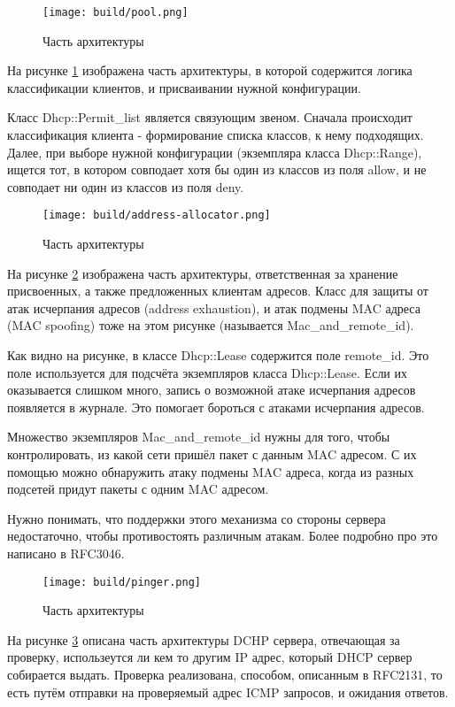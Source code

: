 \documentclass[14pt,a4paper]{extarticle}
\begin{document}
\begin{figure}[H]
    \texttt{[image: build/pool.png]}
    \caption{Часть архитектуры}
    \label{fig:pool}
\end{figure}

На рисунке \ref{fig:pool} изображена часть архитектуры, в которой содержится логика классификации клиентов, и присваивании нужной конфигурации.

Класс Dhcp::Permit\_list является связующим звеном.
Сначала происходит классификация клиента - формирование списка классов, к нему подходящих.
Далее, при выборе нужной конфигурации (экземпляра класса Dhcp::Range), ищется тот, в котором совподает хотя бы один из классов из поля allow, и не совподает ни один из классов из поля deny.

\begin{figure}[H]
    \texttt{[image: build/address-allocator.png]}
    \caption{Часть архитектуры}
    \label{fig:address_allocator}
\end{figure}

На рисунке \ref{fig:address_allocator} изображена часть архитектуры, ответственная за хранение присвоенных, а также предложенных клиентам адресов.
Класс для защиты от атак исчерпания адресов (address exhaustion), и атак подмены MAC адреса (MAC spoofing) тоже на этом рисунке (называется Mac\_and\_remote\_id).

Как видно на рисунке, в классе Dhcp::Lease содержится поле remote\_id. Это поле используется для подсчёта экземпляров класса Dhcp::Lease. Если их оказывается слишком много, запись о возможной атаке исчерпания адресов появляется в журнале. Это помогает бороться с атаками исчерпания адресов.

Множество экземпляров Mac\_and\_remote\_id нужны для того, чтобы контролировать, из какой сети пришёл пакет с данным MAC адресом.
С их помощью можно обнаружить атаку подмены MAC адреса, когда из разных подсетей придут пакеты с одним MAC адресом.

Нужно понимать, что поддержки этого механизма со стороны сервера недостаточно, чтобы противостоять различным атакам. Более подробно про это написано в RFC3046. \cite{rfc3046}

\begin{figure}[H]
    \texttt{[image: build/pinger.png]}
    \caption{Часть архитектуры}
    \label{fig:pinger}
\end{figure}

На рисунке \ref{fig:pinger} описана часть архитектуры DCHP сервера, отвечающая за проверку, использеутся ли  кем то другим IP адрес, который DHCP сервер собирается выдать. Проверка реализована, способом, описанным в RFC2131, то есть путём отправки на проверяемый адрес ICMP запросов, и ожидания ответов.
\end{document}
